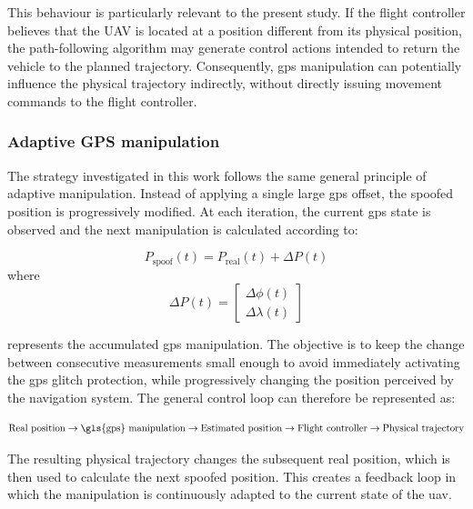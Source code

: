 This behaviour is particularly relevant to the present study.
If the flight controller believes that the UAV is located at a position different from its physical position, the path-following algorithm may generate control actions intended to return the vehicle to the planned trajectory.
Consequently, \gls{gps} manipulation can potentially influence the physical trajectory indirectly, without directly issuing movement commands to the flight controller. 

\subsubsection{Adaptive GPS manipulation}
The strategy investigated in this work follows the same general principle of adaptive manipulation.
Instead of applying a single large \gls{gps} offset, the spoofed position is progressively modified.
At each iteration, the current \gls{gps} state is observed and the next manipulation is calculated according to: 

\begin{equation}
    P_{\mathrm{spoof}}(t) = P_{\mathrm{real}}(t) + \Delta P(t)
\end{equation} 
where 
\begin{equation}
    \Delta P(t) = 
    \begin{bmatrix} 
        \Delta \phi(t)\\
        \Delta \lambda(t)
    \end{bmatrix}
\end{equation} 

represents the accumulated \gls{gps} manipulation. The objective is to keep the change between consecutive measurements small enough to avoid immediately activating the \gls{gps} glitch protection, while progressively changing the position perceived by the navigation system. The general control loop can therefore be represented as: 

\begin{equation}
    \text{Real position} \rightarrow \text{\gls{gps} manipulation} \rightarrow \text{Estimated position} \rightarrow \text{Flight controller} \rightarrow \text{Physical trajectory}
\end{equation} 

The resulting physical trajectory changes the subsequent real position, which is then used to calculate the next spoofed position.
This creates a feedback loop in which the manipulation is continuously adapted to the current state of the \gls{uav}.